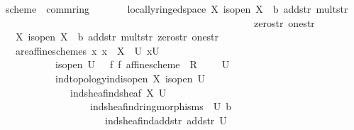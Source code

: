 \documentclass[12pt]{scrartcl}
\begin{document}
\begin{isabelle}
\isamarkupfalse%
\ scheme\ {\isacharequal}{\kern0pt}\ comm{\isacharunderscore}{\kern0pt}ring\ \isanewline
\ \ \ \ \ {\isacharplus}{\kern0pt}\ locally{\isacharunderscore}{\kern0pt}ringed{\isacharunderscore}{\kern0pt}space\ X\ is{\isacharunderscore}{\kern0pt}open\ {\isasymO}\isactrlsub X\ {\isasymrho}\ b\ add{\isacharunderscore}{\kern0pt}str\ mult{\isacharunderscore}{\kern0pt}str\isanewline
\ \ \ \ \ \ \ \ \ \ \ \ \ \ \ \ \ \ \ \ \ \ \ \ \ \ \ \ \ \ \ \ \ \ \ \ \ \ \ \ \ \ \ \ \ \ \ \ \ \ \ zero{\isacharunderscore}{\kern0pt}str\ one{\isacharunderscore}{\kern0pt}str\ \isanewline
\ \ \ X\ is{\isacharunderscore}{\kern0pt}open\ {\isasymO}\isactrlsub X\ {\isasymrho}\ b\ add{\isacharunderscore}{\kern0pt}str\ mult{\isacharunderscore}{\kern0pt}str\ zero{\isacharunderscore}{\kern0pt}str\ one{\isacharunderscore}{\kern0pt}str\ {\isacharplus}{\kern0pt}\isanewline
\ \ \ are{\isacharunderscore}{\kern0pt}affine{\isacharunderscore}{\kern0pt}schemes{\isacharcolon}{\kern0pt}\ {\isachardoublequoteopen}{\isasymAnd}x{\isachardot}{\kern0pt}\ x\ {\isasymin}\ X\ {\isasymLongrightarrow}\ {\isacharparenleft}{\kern0pt}{\isasymexists}U{\isachardot}{\kern0pt}\ x{\isasymin}U\ \isanewline
\ \ \ \ \ \ \ \ \ \ {\isasymand}\ is{\isacharunderscore}{\kern0pt}open\ U\ {\isasymand}\ \ {\isacharparenleft}{\kern0pt}{\isasymexists}f\ {\isasymphi}\isactrlsub f{\isachardot}{\kern0pt}\ affine{\isacharunderscore}{\kern0pt}scheme\ \ R\ {\isacharparenleft}{\kern0pt}{\isacharplus}{\kern0pt}{\isacharparenright}{\kern0pt}\ {\isacharparenleft}{\kern0pt}{\isasymcdot}{\isacharparenright}{\kern0pt}\ {\isasymzero}\ {\isasymone}\ U\ \isanewline
\ \ \ \ \ \ \ \ \ \ \ {\isacharparenleft}{\kern0pt}ind{\isacharunderscore}{\kern0pt}topology{\isachardot}{\kern0pt}ind{\isacharunderscore}{\kern0pt}is{\isacharunderscore}{\kern0pt}open\ X\ is{\isacharunderscore}{\kern0pt}open\ U{\isacharparenright}{\kern0pt}\isanewline
\ \ \ \ \ \ \ \ \ \ \ \ \ \ {\isacharparenleft}{\kern0pt}ind{\isacharunderscore}{\kern0pt}sheaf{\isachardot}{\kern0pt}ind{\isacharunderscore}{\kern0pt}sheaf\ {\isasymO}\isactrlsub X\ U{\isacharparenright}{\kern0pt}\ \isanewline
\ \ \ \ \ \ \ \ \ \ \ \ \ \ \ \ \ \ {\isacharparenleft}{\kern0pt}ind{\isacharunderscore}{\kern0pt}sheaf{\isachardot}{\kern0pt}ind{\isacharunderscore}{\kern0pt}ring{\isacharunderscore}{\kern0pt}morphisms\ {\isasymrho}\ U{\isacharparenright}{\kern0pt}\ b\ \isanewline
\ \ \ \ \ \ \ \ \ \ \ \ \ \ \ \ \ \ \ \ \ {\isacharparenleft}{\kern0pt}ind{\isacharunderscore}{\kern0pt}sheaf{\isachardot}{\kern0pt}ind{\isacharunderscore}{\kern0pt}add{\isacharunderscore}{\kern0pt}str\ add{\isacharunderscore}{\kern0pt}str\ U{\isacharparenright}{\kern0pt}\ \isanewline

\end{isabelle}
\end{document}
